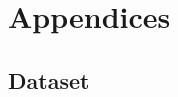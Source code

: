 \documentclass[11pt,]{article}
\begin{document}
\cleardoublepage
\appendix
\setcounter{table}{0}
\setcounter{figure}{0}
\renewcommand{\thetable}{A\arabic{table}}
\renewcommand{\thefigure}{A\arabic{figure}}


\hypertarget{appendices}{%
\section{Appendices}\label{appendices}}

\hypertarget{dataset}{%
\subsection{\texorpdfstring{Dataset
\label{chap:ap1}}{Dataset }}\label{dataset}}
\end{document}
